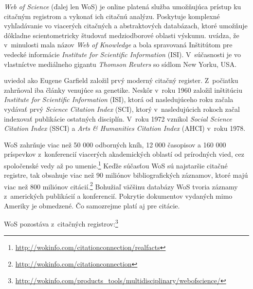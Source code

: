 \emph{Web of Science} (ďalej len WoS) je online platená služba umožňujúca
prístup ku citačným registrom a vykonať ich citačnú analýzu.  Poskytuje
komplexné vyhľadávanie vo viacerých citačných a abstraktových databázach, ktoré
umožňuje dôkladne scientometricky študovať medziodborové oblasti výskumu.
\citet{Drake2005} uvádza, že v~minulosti mala názov \emph{Web of Knowledge} a
bola spravovaná Inštitútom pre vedecké informácie \emph{Institute for Scientific
  Information} (ISI).  V~súčasnosti je vo vlastníctve mediálneho gigantu
\emph{Thomson Reuters} so sídlom New Yorku, USA.

\citet{Smith2012} uviedol ako Eugene Garfield založil prvý moderný citačný
register.  Z~počiatku zahrňoval iba články venujúce sa genetike.  Neskôr v~roku
1960 založil inštitúciu \emph{Institute for Scientific Information} (ISI), ktorá
od nasledujúceho roku začala vydávať prvý 
\emph{Science Citation Index} (SCI), ktorý v~nasledujúcich rokoch začal
indexovať publikácie ostatných disciplín.  V~roku 1972 vznikol  \emph{Social Science Citation Index} (SSCI) a  \emph{Arts \& Humanities Citation Index}
(AHCI) v~roku 1978.

WoS zahrňuje viac než 50 000 odborných kníh, 12 000 časopisov a 160 000
príspevkov z~konferencií viacerých akademických oblastí od prírodných vied, cez
spoločenské vedy až po
umenie.\footnote{\url{http://wokinfo.com/citationconnection/realfacts}} Keďže
súčasťou WoS sú najstaršie citačné registre, tak obsahuje viac než 90 miliónov
bibliografických záznamov, ktoré majú viac než 800 miliónov
citácií.\footnote{\url{http://wokinfo.com/citationconnection}} Bohužiaľ väčšinu
databázy WoS tvoria záznamy z~amerických publikácií a konferencií.  Pokrytie
dokumentov vydaných mimo Ameriky je obmedzené.  Čo samozrejme platí aj pre
citácie.

WoS pozostáva z~citačných
registrov:\footnote{\url{http://wokinfo.com/products_tools/multidisciplinary/webofscience/}}


